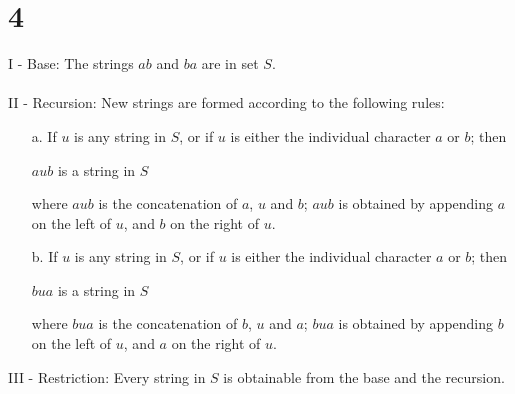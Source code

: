 \documentclass[12pt]{article}
\begin{document}
\section*{4}
I - Base: The strings $ab$ and $ba$ are in set $S$.
\\ \\
II - Recursion: New strings are formed according to the following rules:
\begin{itemize}
  \item [a.] If $u$ is any string in $S$, or if $u$ is either the individual character $a$ or $b$; then
  \begin{center}
    $aub$ is a string in $S$\\
  \end{center}
  where $aub$ is the concatenation of $a$, $u$ and $b$; $aub$ is obtained by appending $a$ on the left of $u$, and $b$ on the right of $u$. 
  \item [b.] If $u$ is any string in $S$, or if $u$ is either the individual character $a$ or $b$; then
  \begin{center}
    $bua$ is a string in $S$\\
  \end{center}
  where $bua$ is the concatenation of $b$, $u$ and $a$; $bua$ is obtained by appending $b$ on the left of $u$, and $a$ on the right of $u$.
\end{itemize} 
III - Restriction: Every string in $S$ is obtainable from the base and the recursion.


\newpage
\end{document}
